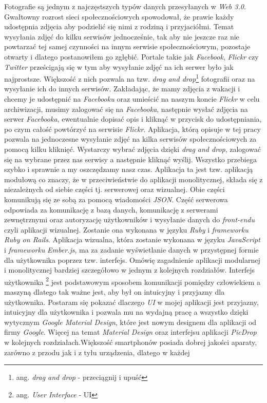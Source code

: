 \documentclass[openright]{xmgr}
\begin{document}
\maketitle
%
\introduction
\indent Fotografie są jednym z najczęstszych typów danych przesyłanych w \textit{Web 3.0}. Gwałtowny rozrost sieci społecznościowych spowodował, że prawie każdy udostępnia zdjęcia aby podzielić się nimi z rodziną i przyjaciółmi. Temat wysyłania zdjęć do kilku serwisów jednocześnie, tak aby nie jeszcze raz nie powtarzać tej samej czynności na innym serwisie społecznościowym, pozostaje otwarty i dlatego postanowiłem go zgłębić.
\newline\indent Portale takie jak \textit{Facebook}, \textit{Flickr} czy \textit{Twitter} prześcigają się w tym aby wysyłanie zdjęć na ich serwer było jak najprostsze. Większość z nich pozwala na tzw. \textit{drag and drop}\footnote{ang. \textit{drag and drop} - przeciągnij i upuść} fotografii oraz na wysyłanie ich do innych serwisów. Zakładając, że mamy zdjęcia z wakacji i chcemy je udostępnić na \textit{Facebooku} oraz umieścić na naszym koncie \textit{Flickr} w celu archiwizacji, musimy zalogować się na \textit{Facebooka}, następnie wysłać zdjęcia na serwer \textit{Facebooka}, ewentualnie dopisać opis i kliknąć w przycisk do udostępniania, po czym całość powtórzyć na serwisie \textit{Flickr}. Aplikacja, którą opisuje w tej pracy pozwala na jednoczesne wysyłanie zdjęć na kilka serwisów społecznościowych za pomocą kilku kliknięć. Wystarczy wybrać zdjęcia dzięki \textit{drag and drop}, zalogować się na wybrane przez nas serwisy a następnie kliknąć wyślij. Wszystko przebiega szybko i sprawnie a my oszczędzamy nasz czas. Aplikacja ta jest tzw. aplikacją modułową co znaczy, że w przeciwieństwie do aplikacji monolitycznej, składa się z  niezależnych od siebie części tj. serwerowej oraz wizualnej. Obie części komunikują się ze sobą za pomocą wiadomości \textit{JSON}. Część serwerowa odpowiada za komunikację z bazą danych, komunikację z serwerami zewnętrznymi oraz autoryzację użytkowników i wysyłanie danych do \textit{front-endu} czyli aplikacji wizualnej. Zostanie ona wykonana w języku \textit{Ruby} i \textit{frameworku} \textit{Ruby on Rails}.   Aplikacja wizualna, która zostanie wykonana w języku \textit{JavaScript} i \textit{frameworku} \textit{Ember.js}, ma za zadanie wyświetlanie danych w przystępnej formie dla użytkownika poprzez tzw. interfejs. Omówię zagadnienie aplikacji modularnej i monolitycznej bardziej szczegółowo w jednym z kolejnych rozdziałów. Interfejs użytkownika \footnote{ang. \textit{User Interface} - UI}  jest podstawowym sposobem komunikacji pomiędzy człowiekiem a maszyną dlatego tak ważne jest, aby był on intuicyjny i przyjazny dla użytkownika. Postaram się pokazać dlaczego \textit{UI} w mojej aplikacji jest przyjazny, intuicyjny dla użytkownika i pozwala mu na wydajną pracę a wszystko dzięki wytycznym \textit{Google Material Design}, które jest nowym designem dla aplikacji od firmy \textit{Google}. Więcej na temat \textit{Material Design} oraz interfejsu aplikacji \textit{PicDrop} w kolejnych rozdziałach.\newline \indent Większość smartphonów posiada dobrej jakości aparaty, zarówno z przodu jak i z tyłu urządzenia, dlatego w każdej 
\end{document}
